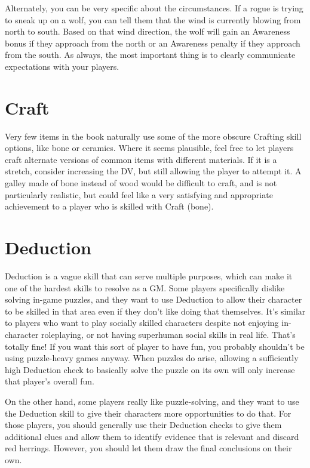   Alternately, you can be very specific about the circumstances.
  If a rogue is trying to sneak up on a wolf, you can tell them that the wind is currently blowing from north to south.
  Based on that wind direction, the wolf will gain an Awareness bonus if they approach from the north or an Awareness penalty if they approach from the south.
  As always, the most important thing is to clearly communicate expectations with your players.

\section{Craft}

  Very few items in the book naturally use some of the more obscure Crafting skill options, like bone or ceramics.
  Where it seems plausible, feel free to let players craft alternate versions of common items with different materials.
  If it is a stretch, consider increasing the DV, but still allowing the player to attempt it.
  A galley made of bone instead of wood would be difficult to craft, and is not particularly realistic, but could feel like a very satisfying and appropriate achievement to a player who is skilled with Craft (bone).

\section{Deduction}

  Deduction is a vague skill that can serve multiple purposes, which can make it one of the hardest skills to resolve as a GM.
  Some players specifically dislike solving in-game puzzles, and they want to use Deduction to allow their character to be skilled in that area even if they don't like doing that themselves.
  It's similar to players who want to play socially skilled characters despite not enjoying in-character roleplaying, or not having superhuman social skills in real life.
  That's totally fine!
  If you want this sort of player to have fun, you probably shouldn't be using puzzle-heavy games anyway.
  When puzzles do arise, allowing a sufficiently high Deduction check to basically solve the puzzle on its own will only increase that player's overall fun.

  On the other hand, some players really like puzzle-solving, and they want to use the Deduction skill to give their characters more opportunities to do that.
  For those players, you should generally use their Deduction checks to give them additional clues and allow them to identify evidence that is relevant and discard red herrings.
  However, you should let them draw the final conclusions on their own.

